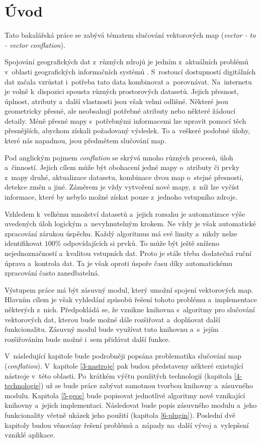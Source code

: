 \chapter{Úvod}
\label{1-uvod}

Tato bakalářská práce se zabývá tématem slučování vektorových map
(\textit{vector - to - vector conflation}).

Spojování geografických dat z~různých zdrojů je jedním z~aktuálních
problémů v~oblasti geografických informačních systémů . 
S~rostoucí dostupností digitálních dat začala vzrůstat i~potřeba 
tato data kombinovat a~porovnávat. Na~internetu je volně k~dispozici 
spousta různých prostorových datasetů. Jejich přesnost, úplnost, 
atributy a~další vlastnosti jsou však velmi odlišné. Některé jsou 
geometricky přesné, ale neobsahují potřebné atributy nebo
některé žádoucí detaily. Méně přesné mapy s~potřebnými informacemi
lze upravit pomocí těch přesnějších, abychom získali požadovaný
výsledek. To a~veškeré podobné úlohy, které nás napadnou, jsou 
předmětem slučování map.

Pod anglickým pojmem \textit{conflation} se skrývá mnoho různých
procesů, úloh a~činností. Jejich cílem může být obohacení jedné 
mapy o~atributy či prvky z~mapy druhé, aktualizace datasetu, kombinace 
dvou map o~stejné přesnosti, detekce změn a jiné. Záměrem je vždy 
vytvoření nové mapy, z~níž lze vyčíst informace, které by nebylo možné
získat pouze z~jednoho vstupního zdroje.

Vzhledem k~velkému množství datasetů a~jejich rozsahu je automatizace
výše uvedených úloh logickým a~nevyhnutelným krokem. Ne vždy je však
automatické zpracování zárukou úspěchu. Každý algoritmus má své limity
a~nikdy nelze identifikovat $100\%$ odpovídajících si prvků. To může
být ještě sníženo nejednoznačností a~kvalitou vstupních dat. Proto
je stále třeba dodatečná ruční úprava a~kontrola dat. Ta je však
oproti úspoře času díky automatickému zpracování často zanedbatelná.

Výstupem práce má být zásuvný modul, který umožní spojení
vektorových map. Hlavním cílem je však vyhledání způsobů
řešení tohoto problému a~implementace některých z~nich.
Předpokládá se, že vznikne knihovna s~algoritmy pro slučování
vektorových dat, kterou bude možné dále rozšiřovat a~doplňovat
další funkcionalitu. Zásuvný modul bude využívat tuto knihovnu
a~s~jejím rozšiřováním bude možné i~sem přidávat další funkce.   

V~následující kapitole bude podrobněji popsána problematika 
slučování map (\textit{conflation}). V~kapitole \ref{3-nastroje}
pak budou představeny některé existující nástroje v~této oblasti.
Po~krátkém výčtu použitých technologií (kapitola \ref{4-technologie})
už se bude práce zabývat samotnou tvorbou knihovny a~zásuvného
modulu. Kapitola \ref{5-geoc} bude popisovat jednotlivé algoritmy
nově vznikající knihovny a~jejich implementaci. Následovat
bude popis zásuvného modulu a~jeho funkcionality včetně
ukázek jeho použití (kapitola \ref{6-plugin}). Poslední dvě kapitoly
budou věnovány řešení problémů a~nápady na~další vývoj 
a~vylepšení vzniklé aplikace.  